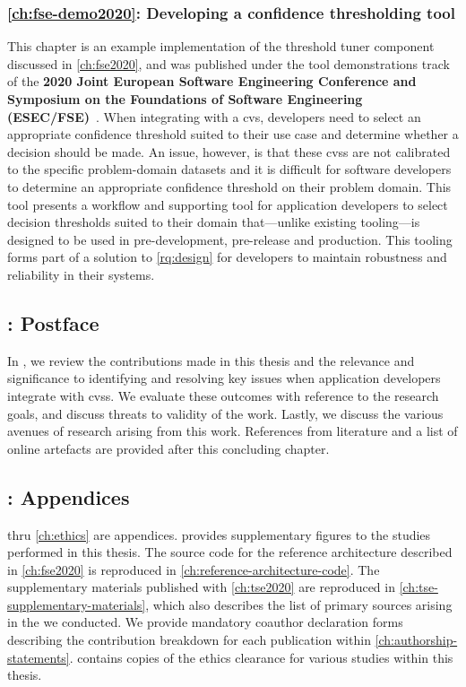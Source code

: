 \subsubsection[Chapter 10: Developing a confidence thresholding tool]{\cref{ch:fse-demo2020}: Developing a confidence thresholding tool} This chapter is an example implementation of the threshold tuner component discussed in \cref{ch:fse2020}, and was published under the tool demonstrations track of the \textbf{2020 Joint European Software Engineering Conference and Symposium on the Foundations of Software Engineering (ESEC/FSE)}~\citep{Cummaudo:2020fse-demo}. When integrating with a \gls{cvs}, developers need to select an appropriate confidence threshold suited to their use case and determine whether a decision should be made. An issue, however, is that these \glspl{cvs} are not calibrated to the specific problem-domain datasets and it is difficult for software developers to determine an appropriate confidence threshold on their problem domain. This tool presents a workflow and supporting tool for application developers to select decision thresholds suited to their domain that---unlike existing tooling---is designed to be used in pre-development, pre-release and production. This tooling forms part of a solution to \ref{rq:design} for developers to maintain robustness and reliability in their systems.

\subsection[Part III: Postface]{: Postface}

In , we review the contributions made in this thesis and the relevance and significance to identifying and resolving key issues when application developers integrate with \glspl{cvs}. We evaluate these outcomes with reference to the research goals, and discuss threats to validity of the work. Lastly, we discuss the various avenues of research arising from this work. References from literature and a list of online artefacts are provided after this concluding chapter.

\subsection[Part IV: Appendices]{: Appendices}

 thru \cref{ch:ethics} are appendices.  provides supplementary figures to the studies performed in this thesis. The source code for the reference architecture described in \cref{ch:fse2020} is reproduced in \cref{ch:reference-architecture-code}. The supplementary materials published with \cref{ch:tse2020} are reproduced in \cref{ch:tse-supplementary-materials}, which also describes the list of primary sources arising in the  we conducted.
 We provide mandatory coauthor declaration forms describing the contribution breakdown for each publication within \cref{ch:authorship-statements}.  contains copies of the ethics clearance for various studies within this thesis. 

